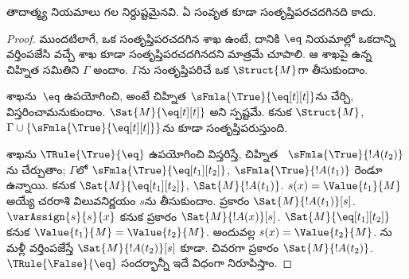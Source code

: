 \documentclass[../../../include/open-logic-section]{subfiles}
\begin{document}


\begin{prop}
తాదాత్మ్య నియమాలు గల  నిర్దుష్టమైనవి. ఏ సంవృత
 కూడా సంతృప్తిపరచదగినది కాదు.
\end{prop}

\begin{proof}
ముందటిలాగే, ఒక  సంతృప్తిపరచదగిన శాఖ ఉంటే, దానికి
$\eq$ నియమాల్లో ఒకదాన్ని వర్తింపజేసి వచ్చే శాఖ కూడా
సంతృప్తిపరచదగినదని మాత్రమే చూపాలి. ఆ శాఖపై ఉన్న చిహ్నిత
 సమితిని $\Gamma$ అందాం. $\Gamma$ను సంతృప్తిపరిచే ఒక
 $\Struct{M}$గా తీసుకుందాం.

శాఖను~$\eq$ ఉపయోగించి, అంటే చిహ్నిత 
$\sFmla{\True}{\eq[t][t]}$ను చేర్చి, విస్తరించామనుకుందాం. $\Sat{M}{\eq[t][t]}$ అని స్పష్టమే. కనుక $\Struct{M}$, $\Gamma \cup
\{\sFmla{\True}{\eq[t][t]}\}$ను కూడా సంతృప్తిపరుస్తుంది.

శాఖను $\TRule{\True}{\eq}$ ఉపయోగించి విస్తరిస్తే, చిహ్నిత
~$\sFmla{\True}{!A(t_2)}$ను చేర్చుతాం; $\Gamma$లో
$\sFmla{\True}{\eq[t_1][t_2]}$, $\sFmla{\True}{!A(t_1)}$ రెండూ
ఉన్నాయి. కనుక $\Sat{M}{\eq[t_1][t_2]}$, $\Sat{M}{!A(t_1)}$.
$s(x) = \Value{t_1}{M}$ అయ్యే చరరాశి విలువనిర్ణయం $s$ను తీసుకుందాం.
 ప్రకారం
$\Sat{M}{!A(t_1)}[s]$. $\varAssign{s}{s}{x}$ కనుక
 ప్రకారం $\Sat{M}{!A(x)}[s]$.
$\Sat{M}{\eq[t_1][t_2]}$ కనుక
$\Value{t_1}{M} = \Value{t_2}{M}$. అందువల్ల
$s(x) = \Value{t_2}{M}$. ను
మళ్లీ వర్తింపజేస్తే $\Sat{M}{!A(t_2)}[s]$ కూడా. చివరగా
 ప్రకారం
$\Sat{M}{!A(t_2)}$. $\TRule{\False}{\eq}$ సందర్భాన్నీ ఇదే విధంగా
నిరూపిస్తాం.
\end{proof}
\end{document}
